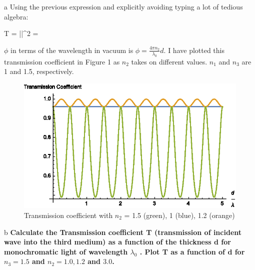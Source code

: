 \begin{homeworkProblem}
\begin{homeworkSection}{a}
Using the previous expression and explicitly avoiding typing a lot of tedious algebra: 

\begin{problemAnswer}{
T = ||^2 = }
\end{problemAnswer}

$\phi$ in terms of the wavelength in vacuum is $\phi = \frac{4\pi n_2}{\lambda_0}d$. I have plotted this transmission coefficient in Figure 1 as $n_2$ takes on different values. $n_1$ and $n_3$ are 1 and 1.5, respectively.

\begin{figure}
  \centering\includegraphics[width=.5\textwidth]{Images/TransCoef.eps}
  \caption{Transmission coefficient with $n_2$ = 1.5 (green), 1 (blue), 1.2 (orange) }
\end{figure}
\end{homeworkSection}

\begin{homeworkSection}{b}
\textbf{Calculate the Transmission coefficient T (transmission of incident wave into the third medium)
as a function of the thickness d for monochromatic light of wavelength $\lambda_0$ . Plot T as a function of
d for $n_3 =1.5$ and $n_2 =1.0, 1.2$ and $3.0$.}
\\


\end{homeworkSection}
\end{homeworkProblem}
